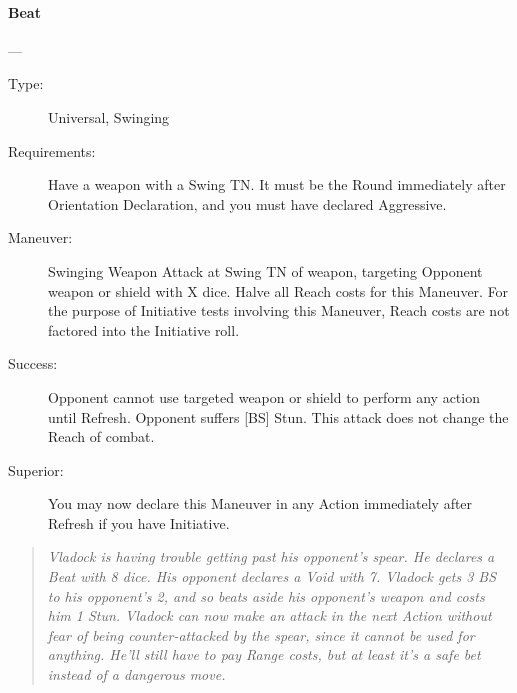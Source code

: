 \documentclass[oneside,11pt,english]{book}
\begin{document}
\paragraph{\large Beat \label{man:Beat}}---\quad{\large[X]}
\vspace{-10pt}\begin{description}
\item [Type:] Universal, Swinging
\item [Requirements:] Have a weapon with a Swing TN. It must be the Round
  immediately after Orientation Declaration, and you must have declared
  Aggressive. 
\item [Maneuver:] Swinging Weapon Attack at Swing TN of weapon, targeting
  Opponent weapon or shield with X dice. Halve all Reach costs for this
  Maneuver. For the purpose of Initiative tests involving this Maneuver, Reach
  costs are not factored into the Initiative roll.  
\item [Success:] Opponent cannot use targeted weapon or shield to perform any
  action until Refresh. Opponent suffers [BS] Stun. This attack does not change
  the Reach of combat.  
\item [Superior:] You may now declare this Maneuver in any Action immediately
  after Refresh if you have Initiative.  
\end{description}
\begin{quotation}
  \emph{Vladock is having trouble getting past his opponent’s spear. He declares
    a Beat with 8 dice. His opponent declares a Void with 7. Vladock gets 3 BS
    to his opponent’s 2, and so beats aside his opponent’s weapon and costs him
    1 Stun. Vladock can now make an attack in the next Action without fear of
    being counter-attacked by the spear, since it cannot be used for anything.
    He’ll still have to pay Range costs, but at least it’s a safe bet instead of
    a dangerous move. } 
\end{quotation}
\end{document}
